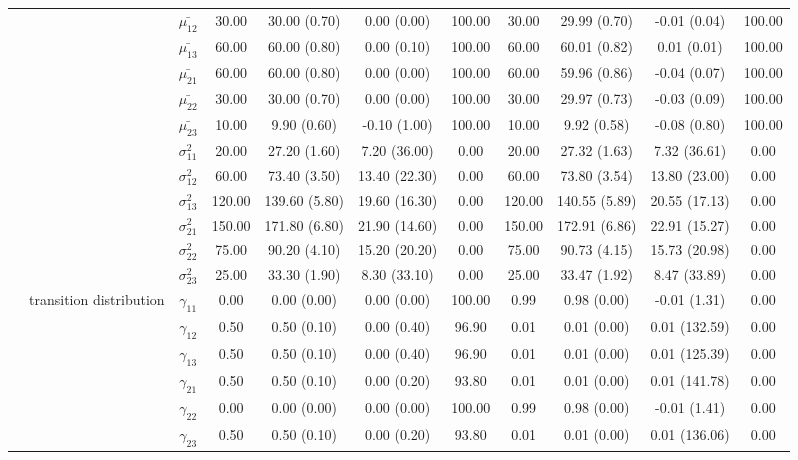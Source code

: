 \begin{table}[h]
{\begin{tabular}{ccccccccccc}
 & \multirow{11}{*}{} & $\bar{\mu_{12}}$ & 30.00 & 30.00 (0.70) & 0.00 (0.00) & 100.00 & 30.00 & 29.99 (0.70) & -0.01 (0.04) & 100.00 \\
 &  & $\bar{\mu_{13}}$ & 60.00 & 60.00 (0.80) & 0.00 (0.10) & 100.00 & 60.00 & 60.01 (0.82) & 0.01 (0.01) & 100.00 \\
 &  & $\bar{\mu_{21}}$ & 60.00 & 60.00 (0.80) & 0.00 (0.00) & 100.00 & 60.00 & 59.96 (0.86) & -0.04 (0.07) & 100.00 \\
 &  & $\bar{\mu_{22}}$ & 30.00 & 30.00 (0.70) & 0.00 (0.00) & 100.00 & 30.00 & 29.97 (0.73) & -0.03 (0.09) & 100.00 \\
 &  & $\bar{\mu_{23}}$ & 10.00 & 9.90 (0.60) & -0.10 (1.00) & 100.00 & 10.00 & 9.92 (0.58) & -0.08 (0.80) & 100.00 \\
 &  & $\sigma^2_{11}$ & 20.00 & 27.20 (1.60) & 7.20 (36.00) & 0.00 & 20.00 & 27.32 (1.63) & 7.32 (36.61) & 0.00 \\
 &  & $\sigma^2_{12}$ & 60.00 & 73.40 (3.50) & 13.40 (22.30) & 0.00 & 60.00 & 73.80 (3.54) & 13.80 (23.00) & 0.00 \\
 &  & $\sigma^2_{13}$ & 120.00 & 139.60 (5.80) & 19.60 (16.30) & 0.00 & 120.00 & 140.55 (5.89) & 20.55 (17.13) & 0.00 \\
 &  & $\sigma^2_{21}$ & 150.00 & 171.80 (6.80) & 21.90 (14.60) & 0.00 & 150.00 & 172.91 (6.86) & 22.91 (15.27) & 0.00 \\
 &  & $\sigma^2_{22}$ & 75.00 & 90.20 (4.10) & 15.20 (20.20) & 0.00 & 75.00 & 90.73 (4.15) & 15.73 (20.98) & 0.00 \\
 &  & $\sigma^2_{23}$ & 25.00 & 33.30 (1.90) & 8.30 (33.10) & 0.00 & 25.00 & 33.47 (1.92) & 8.47 (33.89) & 0.00 \\
 & transition distribution & $\gamma_{11}$ & 0.00 & 0.00 (0.00) & 0.00 (0.00) & 100.00 & 0.99 & 0.98 (0.00) & -0.01 (1.31) & 0.00 \\
 & \multirow{8}{*}{} & $\gamma_{12}$ & 0.50 & 0.50 (0.10) & 0.00 (0.40) & 96.90 & 0.01 & 0.01 (0.00) & 0.01 (132.59) & 0.00 \\
 &  & $\gamma_{13}$ & 0.50 & 0.50 (0.10) & 0.00 (0.40) & 96.90 & 0.01 & 0.01 (0.00) & 0.01 (125.39) & 0.00 \\
 &  & $\gamma_{21}$ & 0.50 & 0.50 (0.10) & 0.00 (0.20) & 93.80 & 0.01 & 0.01 (0.00) & 0.01 (141.78) & 0.00 \\
 &  & $\gamma_{22}$ & 0.00 & 0.00 (0.00) & 0.00 (0.00) & 100.00 & 0.99 & 0.98 (0.00) & -0.01 (1.41) & 0.00 \\
 &  & $\gamma_{23}$ & 0.50 & 0.50 (0.10) & 0.00 (0.20) & 93.80 & 0.01 & 0.01 (0.00) & 0.01 (136.06) & 0.00 \\

\end{tabular}}
\end{table}
